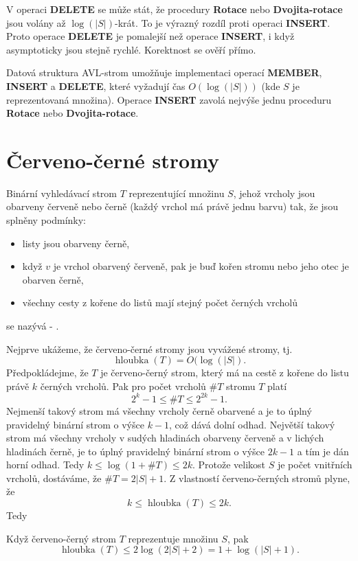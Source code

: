 \documentclass[a4paper,12pt]{article}
\def \emph#1{\underbar{#1}}
\DeclareMathOperator*{\hloubka}{hloubka}
\begin{document}
V operaci {\bf DELETE} se může stát, že procedury 
{\bf Rotace} nebo {\bf Dvojita-rotace} jsou volány až $\log(
|S|)$-krát. 
To je výrazný rozdíl proti operaci {\bf INSERT}. Proto operace 
{\bf DELETE} je pomalejší než operace {\bf INSERT}, i když 
asymptoticky jsou stejně rychlé. Korektnost se 
ověří přímo.

\begin{veta}Datová struktura AVL-strom 
umožňuje implementaci operací {\bf MEMBER}, {\bf INSERT} a 
{\bf DELETE}, které vyžadují čas $O(\log(|S|))$ (kde $
S$ je 
reprezentovaná množina).  Ope\-race {\bf INSERT} zavolá 
nejvýše jednu proceduru {\bf Rotace} nebo {\bf Dvo\-ji\-ta-rotace}.  
\end{veta}

\section{Červeno-černé stromy}

Binární vyhledávací strom $T$ reprezentující 
množinu $S$, jehož vrcholy jsou obarveny červeně nebo 
černě (každý vrchol má právě jednu barvu) tak, že jsou 
splněny podmínky:
\begin{itemize}
\item
listy jsou obarveny černě,
\item
když $v$ je vrchol obarvený červeně, pak je buď kořen 
stromu nebo jeho otec je obarven černě,
\item
všechny cesty z kořene do listů mají stejný 
počet čer\-ných vrcholů
\end{itemize}
se nazývá \emph{červeno}-\emph{černý} \emph{strom}. 

Nejprve ukážeme, že červeno-černé stromy jsou 
vyvážené stro\-my, tj. $$\hloubka(T)=O(\log(|S|).$$
Předpokládejme, že $T$ je červeno-černý strom, který má 
na cestě z kořene do listu právě $k$ černých 
vrcholů. Pak pro počet vrcholů $\#T$ 
stromu $T$ platí 
$$2^k-1\le \#T\le 2^{2k}-1.$$
Nejmenší takový strom má všechny vrcholy černě 
obarvené a je to úplný pravidelný binární strom o 
výšce $k-1$, což dává dolní odhad.  Největší takový 
strom má všechny vrcholy v sudých hladinách obarveny 
červeně a v lichých hladinách černě, je to úplný 
pravidelný binární strom o výšce $2k-1$ a tím je dán 
horní odhad. Tedy $k\le\log(1+\#T)\le 2k$.
Protože velikost $S$ je počet vnitřních vrcholů, 
dostáváme, že $\#T=2|S|+1$. Z vlastností červeno-černých 
stromů plyne, že 
$$k\le\hloubka(T)\le 2k.$$
Tedy

\begin{tvrzeni}Když červeno-černý strom $T$ 
reprezentuje množinu $S$, pak $$\hloubka(T)\le 2\log(2|S|+2)=1+\log(|S|+1).$$
\end{tvrzeni}
\end{document}
